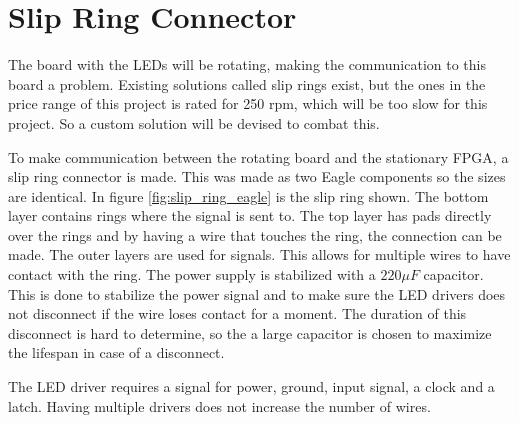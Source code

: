 \section{Slip Ring Connector}\label{sec:ring_connector}
The board with the LEDs will be rotating, making the communication to this board a problem.
Existing solutions called slip rings exist, but the ones in the price range of this project is rated for 250 rpm, which will be too slow for this project.
So a custom solution will be devised to combat this.

To make communication between the rotating board and the stationary FPGA, a slip ring connector is made.
This was made as two Eagle components so the sizes are identical.
In figure \ref{fig:slip_ring_eagle} is the slip ring shown.
The bottom layer contains rings where the signal is sent to.
The top layer has pads directly over the rings and by having a wire that touches the ring, the connection can be made.
The outer layers are used for signals.
This allows for multiple wires to have contact with the ring.
The power supply is stabilized with a $220 \mu F$ capacitor.
This is done to stabilize the power signal and to make sure the LED drivers does not disconnect if the wire loses contact for a moment.
The duration of this disconnect is hard to determine, so the a large capacitor is chosen to maximize the lifespan in case of a disconnect.

The LED driver requires a signal for power, ground, input signal, a clock and a latch.
Having multiple drivers does not increase the number of wires.


